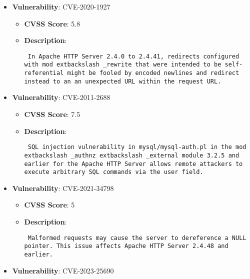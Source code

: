 \documentclass{article}
\begin{document}
\begin{itemize}
        \item \textbf{Vulnerability}: CVE-2020-1927
        \begin{itemize}
            \item \textbf{CVSS Score}:  5.8 
            \item \textbf{Description}: \parbox{\linewidth}{\texttt{ In Apache HTTP Server 2.4.0 to 2.4.41, redirects configured with mod	extbackslash _rewrite that were intended to be self-referential might be fooled by encoded newlines and redirect instead to an an unexpected URL within the request URL. }}
        \end{itemize}
    
        \item \textbf{Vulnerability}: CVE-2011-2688
        \begin{itemize}
            \item \textbf{CVSS Score}:  7.5 
            \item \textbf{Description}: \parbox{\linewidth}{\texttt{ SQL injection vulnerability in mysql/mysql-auth.pl in the mod	extbackslash _authnz	extbackslash _external module 3.2.5 and earlier for the Apache HTTP Server allows remote attackers to execute arbitrary SQL commands via the user field. }}
        \end{itemize}
    
        \item \textbf{Vulnerability}: CVE-2021-34798
        \begin{itemize}
            \item \textbf{CVSS Score}:  5 
            \item \textbf{Description}: \parbox{\linewidth}{\texttt{ Malformed requests may cause the server to dereference a NULL pointer. This issue affects Apache HTTP Server 2.4.48 and earlier. }}
        \end{itemize}
    
        \item \textbf{Vulnerability}: CVE-2023-25690
\end{itemize}
\end{document}
